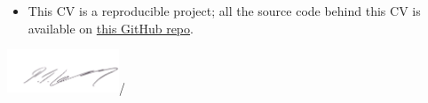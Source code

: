 \documentclass[11pt, a4paper]{awesome-cv}
\providecommand{\tightlist}{%
	\setlength{\itemsep}{0pt}\setlength{\parskip}{0pt}}
\begin{document}
\begin{itemize}
\tightlist
\item
  This CV is a reproducible project; all the source code behind this CV
  is available on \href{https://github.com/Philip-Leftwich/PL_CV}{this
  GitHub repo}.
\end{itemize}

\includegraphics[width=0.25\textwidth,height=0.1\textheight]{data/PL_sig.png}/
\end{document}

